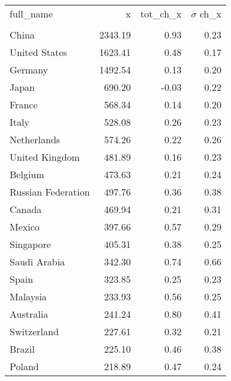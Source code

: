 \documentclass[10pt,letterpaper]{article}
\begin{document}
\begin{tabular}{lrrr}
\toprule
          full\_name &        x &  tot\_ch\_x &  $\sigma$ ch\_x \\
                    &          &           &           \\
\midrule
              China &  2343.19 &      0.93 &      0.23 \\
      United States &  1623.41 &      0.48 &      0.17 \\
            Germany &  1492.54 &      0.13 &      0.20 \\
              Japan &   690.20 &     -0.03 &      0.22 \\
             France &   568.34 &      0.14 &      0.20 \\
              Italy &   528.08 &      0.26 &      0.23 \\
        Netherlands &   574.26 &      0.22 &      0.26 \\
     United Kingdom &   481.89 &      0.16 &      0.23 \\
            Belgium &   473.63 &      0.21 &      0.24 \\
 Russian Federation &   497.76 &      0.36 &      0.38 \\
             Canada &   469.94 &      0.21 &      0.31 \\
             Mexico &   397.66 &      0.57 &      0.29 \\
          Singapore &   405.31 &      0.38 &      0.25 \\
       Saudi Arabia &   342.30 &      0.74 &      0.66 \\
              Spain &   323.85 &      0.25 &      0.23 \\
           Malaysia &   233.93 &      0.56 &      0.25 \\
          Australia &   241.24 &      0.80 &      0.41 \\
        Switzerland &   227.61 &      0.32 &      0.21 \\
             Brazil &   225.10 &      0.46 &      0.38 \\
             Poland &   218.89 &      0.47 &      0.24 \\
\bottomrule
\end{tabular}
\end{document}
